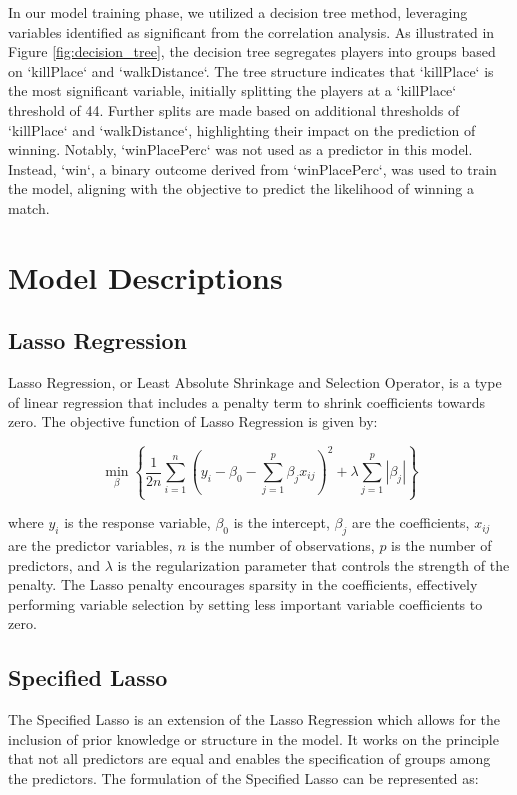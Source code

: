 \documentclass[12pt]{article}
\begin{document}
In our model training phase, we utilized a decision tree method, leveraging variables identified as significant from the correlation analysis. As illustrated in Figure \ref{fig:decision_tree}, the decision tree segregates players into groups based on `killPlace` and `walkDistance`. The tree structure indicates that `killPlace` is the most significant variable, initially splitting the players at a `killPlace` threshold of 44. Further splits are made based on additional thresholds of `killPlace` and `walkDistance`, highlighting their impact on the prediction of winning. Notably, `winPlacePerc` was not used as a predictor in this model. Instead, `win`, a binary outcome derived from `winPlacePerc`, was used to train the model, aligning with the objective to predict the likelihood of winning a match.


\section{Model Descriptions}

\subsection{Lasso Regression}
Lasso Regression, or Least Absolute Shrinkage and Selection Operator, is a type of linear regression that includes a penalty term to shrink coefficients towards zero. The objective function of Lasso Regression is given by:

\begin{equation}
	\min_{\beta} \left\{ \frac{1}{2n} \sum_{i=1}^{n} (y_i - \beta_0 - \sum_{j=1}^{p} \beta_j x_{ij})^2 + \lambda \sum_{j=1}^{p} |\beta_j| \right\}
\end{equation}

where $y_i$ is the response variable, $\beta_0$ is the intercept, $\beta_j$ are the coefficients, $x_{ij}$ are the predictor variables, $n$ is the number of observations, $p$ is the number of predictors, and $\lambda$ is the regularization parameter that controls the strength of the penalty. The Lasso penalty encourages sparsity in the coefficients, effectively performing variable selection by setting less important variable coefficients to zero.

\subsection{Specified Lasso}
The Specified Lasso is an extension of the Lasso Regression which allows for the inclusion of prior knowledge or structure in the model. It works on the principle that not all predictors are equal and enables the specification of groups among the predictors. The formulation of the Specified Lasso can be represented as:
\end{document}
